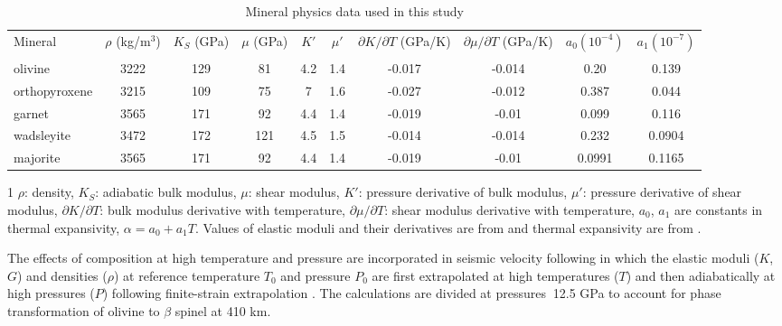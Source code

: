 \documentclass[draft,linenumbers]{agujournal2018}
\begin{document}
\begin{table}
\caption{Mineral physics data used in this study }
\centering
\begin{tabular}{ l c c c c c c c c c } 
\hline
 \multirow{2}{3em}{Mineral} & \multirow{2}{3em}{$\rho$ (kg/m$^3$)} & \multirow{2}{3em}{$K_S$ (GPa)} & \multirow{2}{3em}{$\mu$  (GPa)}  & $K'$ & $\mu'$ &  \multirow{2}{4em}{$\partial K/\partial T$ (GPa/K)}  & \multirow{2}{4em}{$\partial \mu/\partial T$ (GPa/K)} & \multirow{2}{4em}{$a_0 (10^{-4})$} & \multirow{2}{4em}{$a_1 (10^{-7})$} \\ & & & & & & & & & \\
 \hline
  olivine  & 3222 & 129 &  81 & 4.2 & 1.4 & -0.017 & -0.014 & 0.20 &  0.139  \\
  orthopyroxene  & 3215 &  109 &  75 & 7 & 1.6 & -0.027 & -0.012 & 0.387 & 0.044 \\
  garnet  &  3565 & 171 & 92 & 4.4 & 1.4 & -0.019 & -0.01 & 0.099 & 0.116 \\
  wadsleyite  & 3472 & 172 & 121 & 4.5 & 1.5 & -0.014 & -0.014 & 0.232 &  0.0904 \\
  majorite  &  3565  & 171 & 92 & 4.4 & 1.4 & -0.019 & -0.01 &  0.0991 & 0.1165   \\
\hline
\end{tabular}
  \begin{tablenotes}
  \begin {small}
     \item[1] $\rho$: density, $K_S$: adiabatic bulk modulus, $\mu$: shear modulus, $K'$: pressure derivative of bulk modulus, $\mu'$: pressure derivative of shear modulus, $\partial K/\partial T$: bulk modulus derivative with temperature, $\partial \mu/\partial T$: shear modulus derivative with temperature, $a_0$, $a_1$ are constants in thermal expansivity, $\alpha = a_0 + a_1 T$. Values of elastic moduli and their derivatives are from \citet{Cammarano2003} and thermal expansivity are from \citet{saxena_data}.
     \end{small}
  \end{tablenotes}
 \label{table1}
\end{table}

The effects of composition at high temperature and pressure are incorporated in seismic velocity following \citet{Cammarano2003} in which the elastic moduli ($K$, $G$) and densities ($\rho$) at reference temperature $T_0$ and pressure $P_0$ are first extrapolated at high temperatures ($T$) and then adiabatically at high pressures ($P$) following finite-strain extrapolation \citep{duffy1989seismic}. The calculations are divided at pressures $~$12.5 GPa to account for phase transformation of olivine to $\beta$ spinel at 410 km. 
\end{document}
